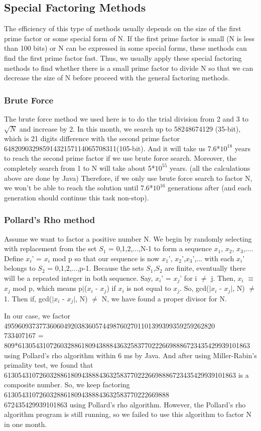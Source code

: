 \documentclass[12pt]{article} %
\begin{document}
\subsection{Special Factoring Methods}
		The efficiency of this type of methods usually depends on the size of the first prime factor or some special form of N. If the first prime factor is small (N is less than 100 bits) or N can be expressed in some special forms, these methods can find the first prime factor fast.
		Thus, we usually apply these special factoring methods to find whether there is a small prime factor to divide N so that we can decrease the size of N before proceed with the general factoring methods.
		
 \subsubsection{ Brute Force}
		The brute force method we used here is to do the trial division from 2 and 3 to $\sqrt{N}$ and increase by 2.
		In this month, we search up to 58248674129 (35-bit), which is 21 digits difference with the second prime factor 64820903298591432157114065708311(105-bit).
		And it will take us 7.6*$10^{18}$ years to reach the second prime factor if we use brute force search.
		Moreover, the completely search from 1 to N will take about 5*$10^{55}$ years. (all the calculations above are done by Java) 
		Therefore, if we only use brute force search to factor N, we won't be able to reach the solution until 7.6*$10^{16}$ generations after (and each generation should continue this task non-stop).
		
 \subsubsection{Pollard's Rho method}
		Assume we want to factor a positive number N. We begin by randomly selecting with replacement from the set $S_1$ = {0,1,2,...,N-1} to form a sequence $x_1$, $x_2$, $x_3$,.... 
		Define $x_i$' = $x_i$ mod p so that our sequence is now $x_1$', $x_2$',$x_3$',... with each $x_i$' belongs to $S_2$ = {0,1,2,...,p-1}.
		Because the sets $S_1$,$S_2$ are finite, eventually there will be a repeated integer in both sequence. Say, $x_i$' = $x_j$' for i $\ne$ j. Then, $x_i$ $\equiv$ $x_j$ mod p, which means p$|$($x_i$ - $x_j$) if $x_i$ is not equal to $x_j$.
		So, gcd($|$$x_i$ - $x_j$$|$, N) $\ne$ 1. Then if, gcd($|$$x_i$ - $x_j$$|$, N) $\ne$ N, we have found a proper divisor for N.
		
		In our case, we factor 495960937377360604920383605744987602701101399399359259262820\\733407167 = 809*613054310726032886180943888436325837702226698886723435429939101863 using Pollard's rho algorithm within 6 ms by Java.
		And after using Miller-Rabin's primality test, we found that 613054310726032886180943888436325837702226698886723435429939101863 is a composite number.
		So, we keep factoring 61305431072603288618094388843632583770222669888\\672435429939101863 using Pollard's rho algorithm.
		However, the Pollard's rho algorithm program is still running, so we failed to use this algorithm to factor N in one month.
\end{document}

